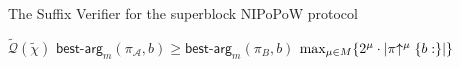 \begin{algorithm}[h]
		\caption{\label{alg:suffix_verifier_soft_fork}The Suffix Verifier for the superblock NIPoPoW protocol~\cite{nipopows}}
		\begin{algorithmic}[1]
							\Let{\tilde{\pi}}{\pi}
							\Let{\tilde{\chi}}{\chi}
						\EndIf
					\EndFor
					\State\Return$\tilde{\mathcal{Q}}(\tilde{\chi})$
				\EndFunction
				\vspace{3mm}
					\State\Return$\mathsf{best\text{-}arg}_m(\pi_\mathcal{A}, b) \geq \mathsf{best\text{-}arg}_m(\pi_B, b)$
				\EndOperator
				\vspace{3mm}
					\State\Return$\text{max}_{\mu \in M}\{2^\mu \cdot \lvert \pi \negthickspace\uparrow^\mu \{b:\} \rvert \}$
				\EndFunction
		\end{algorithmic}
\end{algorithm}